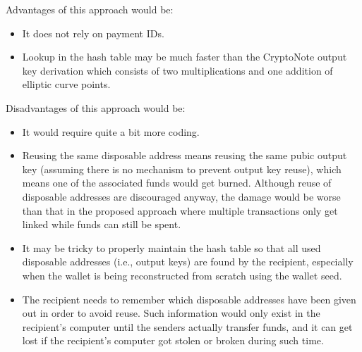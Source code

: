 \documentclass[12pt,english]{mrl}
\theoremstyle{definition}
\numberwithin{equation}{section}
\numberwithin{figure}{section}
\numberwithin{equation}{section}
\numberwithin{equation}{section}
\numberwithin{figure}{section}
\begin{document}
Advantages of this approach would be:
\begin{itemize}
	\item It does not rely on payment IDs.
	\item Lookup in the hash table may be much faster than the CryptoNote output key derivation which consists of two multiplications and one addition of elliptic curve points.
\end{itemize}
Disadvantages of this approach would be:
\begin{itemize}
	\item It would require quite a bit more coding.
	\item Reusing the same disposable address means reusing the same pubic output key (assuming there is no mechanism to prevent output key reuse), which means one of the associated funds would get burned. Although reuse of disposable addresses are discouraged anyway, the damage would be worse than that in the proposed approach where multiple transactions only get linked while funds can still be spent.
	\item It may be tricky to properly maintain the hash table so that all used disposable addresses (i.e., output keys) are found by the recipient, especially when the wallet is being reconstructed from scratch using the wallet seed.
	\item The recipient needs to remember which disposable addresses have been given out in order to avoid reuse. Such information would only exist in the recipient's computer until the senders actually transfer funds, and it can get lost if the recipient's computer got stolen or broken during such time.
\end{itemize}

\medskip{}



\end{document}
